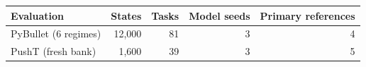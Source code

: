 \begin{tabular}{lrrrr}
\toprule
Evaluation & States & Tasks & Model seeds & Primary references \\
\midrule
PyBullet (6 regimes) & 12,000 & 81 & 3 & 4 \\
PushT (fresh bank) & 1,600 & 39 & 3 & 5 \\
\bottomrule
\end{tabular}
